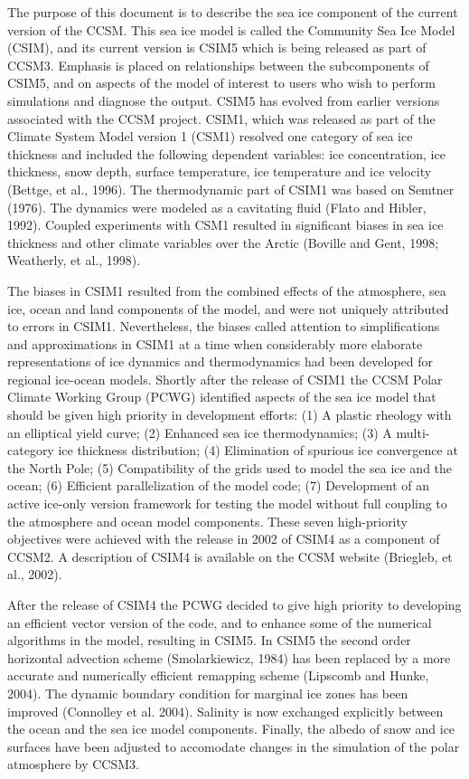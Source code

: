     The purpose of this document is to describe the sea ice component
of the current version of the CCSM.   This sea ice model is called
the Community Sea Ice Model (CSIM), and its current version
is CSIM5 which is being released as part of CCSM3. 
Emphasis is placed on relationships between the subcomponents
of CSIM5, and on aspects of the model of interest to users
who wish to perform simulations and diagnose the output. CSIM5
has evolved from earlier versions associated with the 
CCSM project.  CSIM1, which was released as part of the 
Climate System Model version 1 (CSM1) resolved one category of
sea ice thickness and included the following dependent 
variables:  ice concentration, ice thickness, snow depth, surface
temperature, ice temperature and ice velocity (Bettge, et al., 
1996).  The thermodynamic part of CSIM1 was based on Semtner (1976).
The dynamics were modeled as a cavitating fluid (Flato and 
Hibler, 1992).  Coupled experiments with CSM1 resulted in significant
biases in sea ice thickness and other climate variables
over the Arctic (Boville and Gent, 1998; Weatherly, et al., 1998).  

     The biases in CSIM1 resulted from the combined 
effects of the atmosphere, sea ice, ocean and land components
of the model, and were not uniquely attributed to errors in 
CSIM1.  Nevertheless, the biases called attention to simplifications
and approximations in CSIM1 at a time when considerably 
more elaborate representations of ice dynamics and thermodynamics 
had been developed for regional ice-ocean models.  
Shortly after the release of CSIM1 the CCSM Polar Climate 
Working Group (PCWG) identified aspects of the sea ice model
that should be given high priority in development efforts:
(1) A plastic rheology with an elliptical yield curve;
(2) Enhanced sea ice thermodynamics; (3) A multi-category
ice thickness distribution; (4) Elimination of spurious 
ice convergence at the North Pole; (5) Compatibility of 
the grids used to model the sea ice and the ocean; 
(6) Efficient parallelization of the model code; 
(7) Development of an active ice-only version framework
for testing the model without full coupling to the 
atmosphere and ocean model components.  These seven
high-priority objectives were achieved with the 
release in 2002 of CSIM4 as a component of CCSM2.
A description of CSIM4 is available on the CCSM website
(Briegleb, et al., 2002).

      After the release of CSIM4 the PCWG decided to give 
high priority to developing an efficient vector version of the
code, and to enhance some of the numerical algorithms in the 
model, resulting in CSIM5.  In CSIM5 the second order horizontal
advection scheme (Smolarkiewicz, 1984) has been replaced by
a more accurate and numerically efficient remapping 
scheme (Lipscomb and Hunke, 2004).  The dynamic boundary 
condition for marginal ice zones has been improved (Connolley 
et al. 2004).  Salinity is now exchanged explicitly between 
the ocean and the sea ice model components.  Finally, the 
albedo of snow and ice surfaces have been adjusted to 
accomodate changes in the simulation of the polar atmosphere
by CCSM3.  

